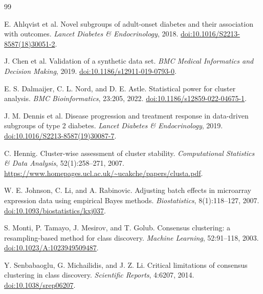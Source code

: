 \documentclass[11pt,a4paper]{article}
\begin{document}
\begin{thebibliography}{99}

E. Ahlqvist et al.
\newblock Novel subgroups of adult-onset diabetes and their association with outcomes.
\newblock \emph{Lancet Diabetes \& Endocrinology}, 2018.
\newblock \href{https://doi.org/10.1016/S2213-8587(18)30051-2}{doi:10.1016/S2213-8587(18)30051-2}.

J. Chen et al.
\newblock Validation of a synthetic data set.
\newblock \emph{BMC Medical Informatics and Decision Making}, 2019.
\newblock \href{https://doi.org/10.1186/s12911-019-0793-0}{doi:10.1186/s12911-019-0793-0}.

E. S. Dalmaijer, C. L. Nord, and D. E. Astle.
\newblock Statistical power for cluster analysis.
\newblock \emph{BMC Bioinformatics}, 23:205, 2022.
\newblock \href{https://doi.org/10.1186/s12859-022-04675-1}{doi:10.1186/s12859-022-04675-1}.

J. M. Dennis et al.
\newblock Disease progression and treatment response in data-driven subgroups of type 2 diabetes.
\newblock \emph{Lancet Diabetes \& Endocrinology}, 2019.
\newblock \href{https://doi.org/10.1016/S2213-8587(19)30087-7}{doi:10.1016/S2213-8587(19)30087-7}.

C. Hennig.
\newblock Cluster-wise assessment of cluster stability.
\newblock \emph{Computational Statistics \& Data Analysis}, 52(1):258--271, 2007.
\newblock \url{https://www.homepages.ucl.ac.uk/~ucakche/papers/clusta.pdf}.

W. E. Johnson, C. Li, and A. Rabinovic.
\newblock Adjusting batch effects in microarray expression data using empirical Bayes methods.
\newblock \emph{Biostatistics}, 8(1):118--127, 2007.
\newblock \href{https://doi.org/10.1093/biostatistics/kxj037}{doi:10.1093/biostatistics/kxj037}.

S. Monti, P. Tamayo, J. Mesirov, and T. Golub.
\newblock Consensus clustering: a resampling-based method for class discovery.
\newblock \emph{Machine Learning}, 52:91--118, 2003.
\newblock \href{https://doi.org/10.1023/A:1023949509487}{doi:10.1023/A:1023949509487}.

Y. Senbabaoglu, G. Michailidis, and J. Z. Li.
\newblock Critical limitations of consensus clustering in class discovery.
\newblock \emph{Scientific Reports}, 4:6207, 2014.
\newblock \href{https://doi.org/10.1038/srep06207}{doi:10.1038/srep06207}.


\end{thebibliography}
\end{document}
